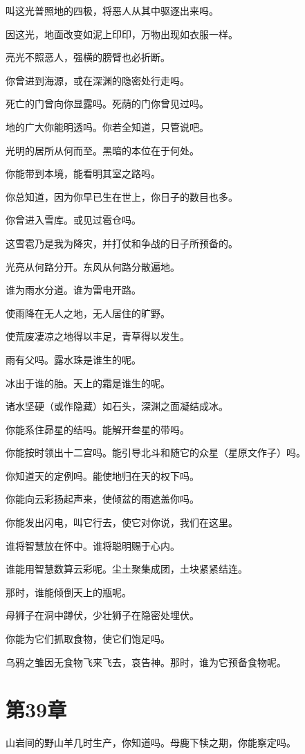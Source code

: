 \documentclass[12pt,oneside]{book}
\begin{document}
叫这光普照地的四极，将恶人从其中驱逐出来吗。

因这光，地面改变如泥上印印，万物出现如衣服一样。

亮光不照恶人，强横的膀臂也必折断。

你曾进到海源，或在深渊的隐密处行走吗。

死亡的门曾向你显露吗。死荫的门你曾见过吗。

地的广大你能明透吗。你若全知道，只管说吧。

光明的居所从何而至。黑暗的本位在于何处。

你能带到本境，能看明其室之路吗。

你总知道，因为你早已生在世上，你日子的数目也多。

你曾进入雪库。或见过雹仓吗。

这雪雹乃是我为降灾，并打仗和争战的日子所预备的。

光亮从何路分开。东风从何路分散遍地。

谁为雨水分道。谁为雷电开路。

使雨降在无人之地，无人居住的旷野。

使荒废凄凉之地得以丰足，青草得以发生。

雨有父吗。露水珠是谁生的呢。

冰出于谁的胎。天上的霜是谁生的呢。

诸水坚硬（或作隐藏）如石头，深渊之面凝结成冰。

你能系住昴星的结吗。能解开叁星的带吗。

你能按时领出十二宫吗。能引导北斗和随它的众星（星原文作子）吗。

你知道天的定例吗。能使地归在天的权下吗。

你能向云彩扬起声来，使倾盆的雨遮盖你吗。

你能发出闪电，叫它行去，使它对你说，我们在这里。

谁将智慧放在怀中。谁将聪明赐于心内。

谁能用智慧数算云彩呢。尘土聚集成团，土块紧紧结连。

那时，谁能倾倒天上的瓶呢。

母狮子在洞中蹲伏，少壮狮子在隐密处埋伏。

你能为它们抓取食物，使它们饱足吗。

乌鸦之雏因无食物飞来飞去，哀告神。那时，谁为它预备食物呢。


\chapter{第39章}
山岩间的野山羊几时生产，你知道吗。母鹿下犊之期，你能察定吗。
\end{document}
